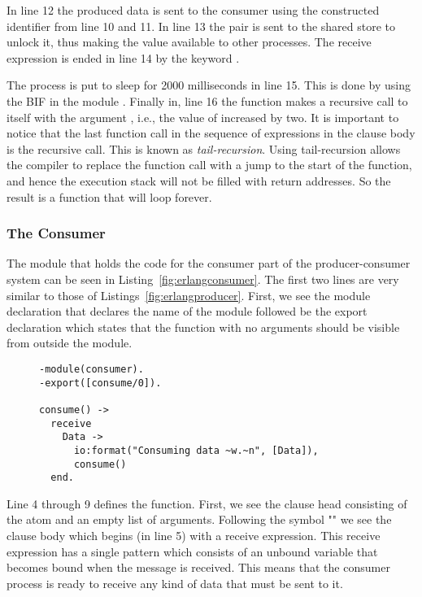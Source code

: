 In line 12 the produced data is sent to the consumer using the constructed identifier from line 10 and 11. In line 13 the pair  is sent to the shared store to unlock it, thus making the value available to other processes. The receive expression is ended in line 14 by the keyword .

The process is put to sleep for 2000 milliseconds in line 15. This is done by using the BIF  in the module . Finally in, line 16 the  function makes a recursive call to itself with the argument , i.e., the value of  increased by two. It is important to notice that the last function call in the sequence of expressions in the clause body is the recursive call. This is known as \emph{tail-recursion}. Using tail-recursion allows the compiler to replace the function call with a jump to the start of the function, and hence the execution stack will not be filled with return addresses. So the result is a function that will loop forever.

\subsubsection{The Consumer}
The module that holds the code for the consumer part of the producer-consumer system can be seen in Listing~\ref{fig:erlangconsumer}. The first two lines are very similar to those of Listings~\ref{fig:erlangproducer}. First, we see the module declaration that declares the name of the module followed be the export declaration which states that the function  with no arguments should be visible from outside the module.

\begin{figure}[h!]
\begin{verbatim}
-module(consumer).
-export([consume/0]).

consume() ->
  receive
    Data ->
      io:format("Consuming data ~w.~n", [Data]),
      consume()
  end.
\end{verbatim}
\end{figure}

Line 4 through 9 defines the  function. First, we see the clause head consisting of the atom  and an empty list of arguments. Following the symbol "\code{->}" we see the clause body which begins (in line 5) with a receive expression. This receive expression has a single pattern which consists of an unbound variable  that becomes bound when the message is received. This means that the consumer process is ready to receive any kind of data that must be sent to it.

